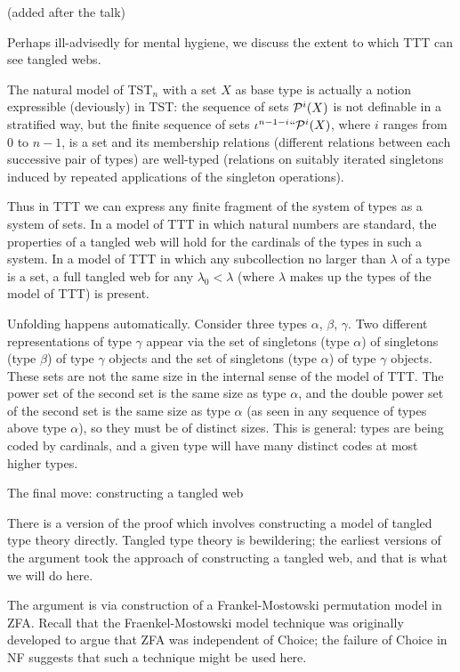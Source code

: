\documentclass{slides}
\begin{document}
\begin{slide}

(added after the talk)

Perhaps ill-advisedly for mental hygiene, we discuss the extent to which TTT can see tangled webs.

The natural model of TST$_n$ with a set $X$ as base type is actually a notion expressible (deviously) in TST:  the sequence of sets ${\cal P}^i(X)$ is not definable in a stratified way, but
the finite sequence of sets $\iota^{n-1-i}``{\cal P}^i(X)$, where $i$ ranges from 0 to $n-1$, is a set and its membership relations (different relations between each successive pair of types) are well-typed (relations on suitably iterated singletons induced by repeated applications of the singleton operations).

Thus in TTT we can express any finite fragment of the system of types as a system of sets.  In a model of TTT in which natural numbers are standard, the properties of a tangled web
will hold for the cardinals of the types in such a system.  In a model of TTT in which any subcollection no larger than $\lambda$ of a type is a set, a full tangled web for any $\lambda_0<\lambda$ (where $\lambda$ makes up the types of the model of TTT) is present.

Unfolding happens automatically.  Consider three types $\alpha$, $\beta$, $\gamma$.   Two different representations of type $\gamma$ appear via the set of singletons (type $\alpha$)
of singletons (type $\beta$) of type $\gamma$ objects and the set of singletons (type $\alpha$) of type $\gamma$ objects.  These sets are not the same size in the internal sense of the model of TTT.  The power set of the second set is the same size as type $\alpha$, and the double power set of the second set is the same size as type $\alpha$ (as seen in any sequence of types above type $\alpha$), so they must be of distinct sizes.  This is general:  types are being coded by cardinals, and a given type will have many distinct codes at most higher types.

\end{slide}

\begin{slide}

{\Large The final move:  constructing a tangled web}

There is a version of the proof which involves constructing a model of tangled type theory directly.  Tangled type theory is bewildering;  the earliest versions of the argument took the approach of constructing a tangled web, and that is what we will do here.

The argument is via construction of a Frankel-Mostowski permutation model in ZFA.   Recall that the Fraenkel-Mostowski model technique was originally developed to argue that ZFA was independent of Choice;  the failure of Choice in NF suggests that such a technique might be used here.


\end{slide}
\end{document}
